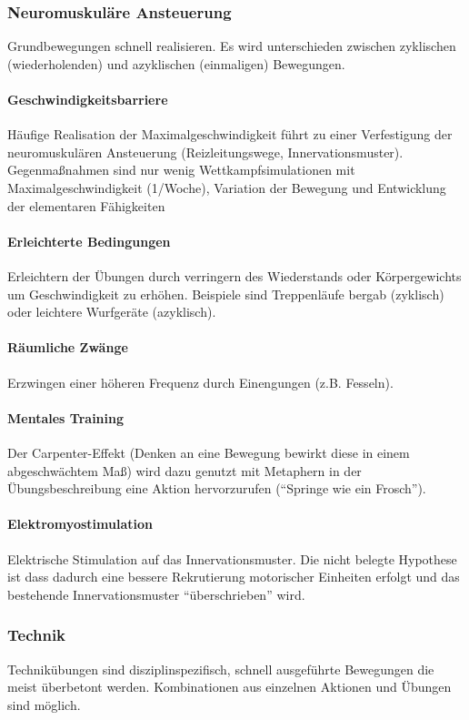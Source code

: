 \subsubsection{Neuromuskuläre Ansteuerung}
Grundbewegungen schnell realisieren. Es wird unterschieden zwischen zyklischen (wiederholenden) und azyklischen (einmaligen) Bewegungen.
\paragraph{Geschwindigkeitsbarriere} Häufige Realisation der Maximalgeschwindigkeit führt zu einer Verfestigung der neuromuskulären Ansteuerung (Reizleitungswege, Innervationsmuster).
Gegenmaßnahmen sind nur wenig Wettkampfsimulationen mit Maximalgeschwindigkeit (1/Woche), Variation der Bewegung und Entwicklung der elementaren Fähigkeiten
\paragraph{Erleichterte Bedingungen} Erleichtern der Übungen durch verringern des Wiederstands oder Körpergewichts um Geschwindigkeit zu erhöhen.
Beispiele sind Treppenläufe bergab (zyklisch) oder leichtere Wurfgeräte (azyklisch).
\paragraph{Räumliche Zwänge} Erzwingen einer höheren Frequenz durch Einengungen (z.B. Fesseln).
\paragraph{Mentales Training} Der Carpenter-Effekt (Denken an eine Bewegung bewirkt diese in einem abgeschwächtem Maß) wird dazu genutzt mit Metaphern in der Übungsbeschreibung eine Aktion hervorzurufen (``Springe wie ein Frosch'').
\paragraph{Elektromyostimulation} Elektrische Stimulation auf das Innervationsmuster. Die nicht belegte Hypothese ist dass dadurch eine bessere Rekrutierung motorischer Einheiten erfolgt und das bestehende Innervationsmuster ``überschrieben'' wird.

\subsubsection{Technik}
Technikübungen sind disziplinspezifisch, schnell ausgeführte Bewegungen die meist überbetont werden.
Kombinationen aus einzelnen Aktionen und Übungen sind möglich.

